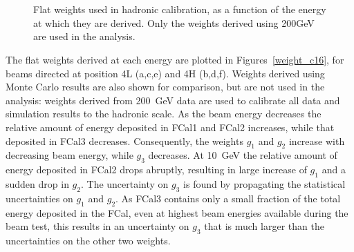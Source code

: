 \begin{figure}
\begin{center}
\\
\\
\caption{Flat weights used in hadronic calibration, as a function of the energy at which they are derived. Only the weights derived using 200GeV are used in the analysis.  }
\label{TBplot_c16_weights}
\end{center}
\end{figure}

The flat weights derived at each energy are plotted in Figures~\ref{weight_c16}, for beams directed at position 4L (a,c,e) and 4H (b,d,f). Weights derived using Monte Carlo results are also shown for comparison, but are not used in the analysis: weights derived from 200~GeV data are used to calibrate all data and simulation results to the hadronic scale. As the beam energy decreases the relative amount of energy deposited in FCal1 and FCal2 increases, while that deposited in FCal3 decreases. Consequently, the weights $g_1$ and $g_2$ increase with decreasing beam energy, while $g_3$ decreases. At 10~GeV the relative amount of energy deposited in FCal2 drops abruptly, resulting in large increase of $g_1$ and a sudden drop in $g_2$.  The uncertainty on $g_3$ is found by propagating the statistical uncertainties on $g_1$ and $g_2$. As FCal3 contains only a small fraction of the total energy deposited in the FCal, even at highest beam energies available during the beam test, this results in an uncertainty on $g_3$ that is much larger than the uncertainties on the other two weights.




